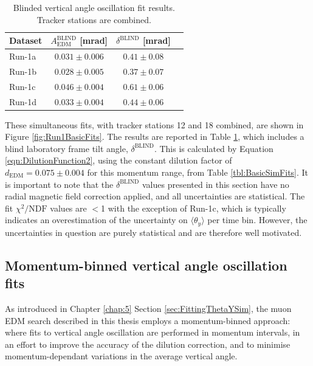 \begin{table}[h!]
\centering{}
\begin{tabular}{l|ccc}
\hline
\hline
Dataset & $A_{\text{EDM}}^{\text{BLIND}}$ [mrad] & $\delta^{\text{BLIND}}$ [mrad] \\ %
\hline
Run-1a  & $0.031\pm0.006$ & $0.41\pm0.08$ \\%
Run-1b  & $0.028\pm0.005$ & $0.37\pm0.07$ \\ %
Run-1c  & $0.046\pm0.004$ & $0.61\pm0.06$ \\ %
Run-1d  & $0.033\pm0.004$ & $0.44\pm0.06$ \\ %
\hline
\hline
\end{tabular}
\caption{Blinded vertical angle oscillation fit results. Tracker stations are combined.} 
\label{tbl:Run1BasicFits}
\end{table}

\clearpage

These simultaneous fits, with tracker stations 12 and 18 combined, are shown in Figure \ref{fig:Run1BasicFits}. The results are reported in Table \ref{tbl:Run1BasicFits}, which includes a blind laboratory frame tilt angle, $\delta^{\text{BLIND}}$. This is calculated by Equation \ref{eqn:DilutionFunction2}, using the constant dilution factor of $d_{\text{EDM}}=0.075\pm0.004$ for this momentum range, from Table \ref{tbl:BasicSimFits}. It is important to note that the $\delta^{\text{BLIND}}$ values presented in this section have no radial magnetic field correction applied, and all uncertainties are statistical. The fit $\chi^{2}/\text{NDF}$ values are $<$1 with the exception of Run-1c, which is typically indicates an overestimation of the uncertainty on $\langle\theta_{y}\rangle$ per time bin. However, the uncertainties in question are purely statistical and are therefore well motivated. 

\subsection{Momentum-binned vertical angle oscillation fits}

As introduced in Chapter \ref{chap:5} Section \ref{sec:FittingThetaYSim}, the muon EDM search described in this thesis employs a momentum-binned approach: where fits to vertical angle oscillation are performed in momentum intervals, in an effort to improve the accuracy of the dilution correction, and to minimise momentum-dependant variations in the average vertical angle. 

